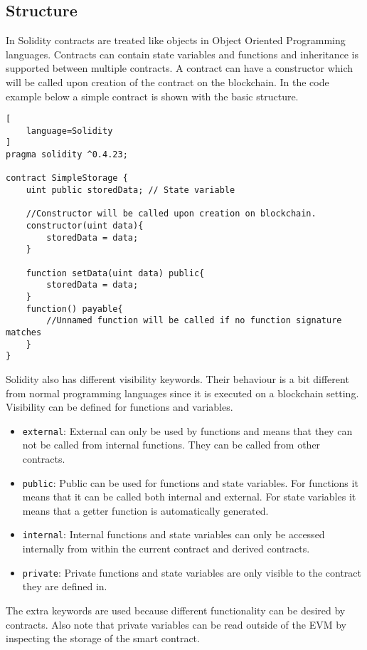 \documentclass[a4paper]{article}
\begin{document}
\subsection{Structure}
In Solidity contracts are treated like objects in Object Oriented Programming languages. Contracts can contain state variables and functions and inheritance is supported between multiple contracts. A contract can have a constructor which will be called upon creation of the contract on the blockchain. In the code example below a simple contract is shown with the basic structure.
\begin{lstlisting}[
    language=Solidity
]
pragma solidity ^0.4.23;

contract SimpleStorage {
    uint public storedData; // State variable
    
    //Constructor will be called upon creation on blockchain.
    constructor(uint data){ 
        storedData = data;
    }
    
    function setData(uint data) public{
        storedData = data;
    }
    function() payable{
        //Unnamed function will be called if no function signature matches
    }
}
\end{lstlisting}
Solidity also has different visibility keywords. Their behaviour is a bit different from normal programming languages since it is executed on a blockchain setting. Visibility can be defined for functions and variables.
\begin{itemize}
    \item \texttt{external}: External can only be used by functions and means that they can not be called from internal functions. They can be called from other contracts.
    \item \texttt{public}: Public can be used for functions and state variables. For functions it means that it can be called both internal and external. For state variables it means that a getter function is automatically generated.
    \item \texttt{internal}: Internal functions and state variables can only be accessed internally from within the current contract and derived contracts.
    \item \texttt{private}: Private functions and state variables are only visible to the contract they are defined in.
\end{itemize}
The extra keywords are used because different functionality can be desired by contracts. Also note that private variables can be read outside of the EVM by inspecting the storage of the smart contract.\\
\end{document}
